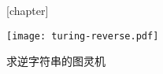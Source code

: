 [chapter]
\begin{flowchart}
  \centering
  \texttt{[image: turing-reverse.pdf]}
  \caption{求逆字符串的图灵机}
\end{flowchart}
